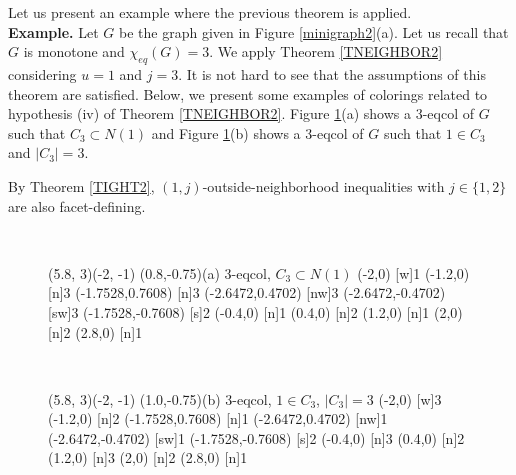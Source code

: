 Let us present an example where the previous theorem is applied.\\

\noindent \textbf{Example.} Let $G$ be the graph given in Figure \ref{minigraph2}(a). Let us recall that $G$ is
monotone and $\chi_{eq}(G) = 3$.
We apply Theorem \ref{TNEIGHBOR2} considering $u = 1$ and $j = 3$. It is not hard to see that the assumptions of
this theorem are satisfied. Below, we present some examples of colorings related to hypothesis (iv) of
Theorem \ref{TNEIGHBOR2}. Figure \ref{minigraph3}(a) shows a 3-eqcol of $G$ such that $C_3 \subset N(1)$
and Figure \ref{minigraph3}(b) shows a 3-eqcol of $G$ such that $1 \in C_3$ and $|C_3| = 3$.


By Theorem \ref{TIGHT2}, $(1,j)$-outside-neighborhood inequalities with $j \in \{1,2\}$ are also facet-defining.

\begin{figure}[h]
  \centering ~~~~~~~~~~~
\begin{graph}(5.8, 3)(-2, -1)
	\freetext(0.8,-0.75){(a) 3-eqcol, $C_3 \subset N(1)$}
	(-2,0)
	{1}
	(-1.2,0)
	{3}
	(-1.7528,0.7608)
	{3}
	(-2.6472,0.4702)
	[nw]{3}
	(-2.6472,-0.4702)
	[sw]{3}
	(-1.7528,-0.7608)
	{2}
	(-0.4,0)
	{1}
	(0.4,0)
	{2}
	(1.2,0)
	{1}
	(2,0)
	{2}
	(2.8,0)
	{1}
\end{graph}~~~~~~~
\begin{graph}(5.8, 3)(-2, -1)
	\freetext(1.0,-0.75){(b) 3-eqcol, $1 \in C_3$, $|C_3| = 3$}
	(-2,0)
	{3}
	(-1.2,0)
	{2}
	(-1.7528,0.7608)
	{1}
	(-2.6472,0.4702)
	[nw]{1}
	(-2.6472,-0.4702)
	[sw]{1}
	(-1.7528,-0.7608)
	{2}
	(-0.4,0)
	{3}
	(0.4,0)
	{2}
	(1.2,0)
	{3}
	(2,0)
	{2}
	(2.8,0)
	{1}
\end{graph}
  \caption{}
  \label{minigraph3}
\end{figure}

